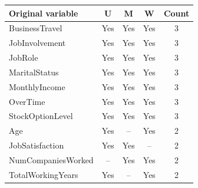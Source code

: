 \begin{tabular}{lcccc}
\toprule
Original variable & U & M & W & Count \\
\midrule
BusinessTravel & Yes & Yes & Yes & 3 \\
JobInvolvement & Yes & Yes & Yes & 3 \\
JobRole & Yes & Yes & Yes & 3 \\
MaritalStatus & Yes & Yes & Yes & 3 \\
MonthlyIncome & Yes & Yes & Yes & 3 \\
OverTime & Yes & Yes & Yes & 3 \\
StockOptionLevel & Yes & Yes & Yes & 3 \\
Age & Yes & -- & Yes & 2 \\
JobSatisfaction & Yes & Yes & -- & 2 \\
NumCompaniesWorked & -- & Yes & Yes & 2 \\
TotalWorkingYears & Yes & -- & Yes & 2 \\
\bottomrule
\end{tabular}
